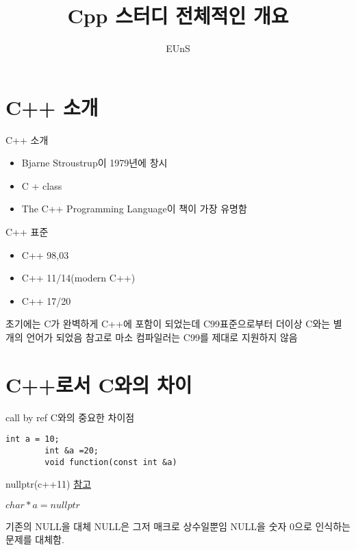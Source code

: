 \documentclass[10pt]{beamer}
\title{Cpp 스터디 전체적인 개요}
\author{EUnS}
\begin{document}


\section{C++ 소개}

\begin{frame}{C++ 소개}
    \begin{itemize}
        \item Bjarne Stroustrup이 1979년에 창시
        \item C + class
        \item The C++ Programming Language이 책이 가장 유명함
    \end{itemize}
\end{frame}

\begin{frame}{C++ 표준}
    \begin{itemize}
        \item C++ 98,03
        \item C++ 11/14(modern C++)
        \item C++ 17/20~
    \end{itemize}
    초기에는 C가 완벽하게 C++에 포함이 되었는데 C99표준으로부터 더이상 C와는 별개의 언어가 되었음 참고로 마소 컴파일러는 C99를 제대로 지원하지 않음
\end{frame}

\section{C++로서 C와의 차이}

\begin{frame}[fragile]{call by ref}
    C와의 중요한 차이점
    \begin{lstlisting}[style = CStyle]
        int a = 10;
        int &a =20;
        void function(const int &a)
    \end{lstlisting}
\end{frame}



\begin{frame}{nullptr(c++11)}
    \href{https://www.youtube.com/watch?v=Lt8MoQ-Rz-c&list=PLW_uvsSPlijtSmrhajc3Y02G86lOieQOb&index=5}{참고}

    $char * a = nullptr$
    
    기존의 NULL을 대체 NULL은 그저 매크로 상수일뿐임
    NULL을 숫자 0으로 인식하는 문제를 대체함.
\end{frame}
\end{document}
